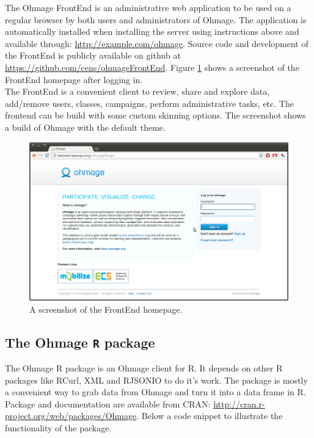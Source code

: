 \documentclass{scrartcl}
\begin{document}
The Ohmage FrontEnd is an administrative web application to be used on a regular
browser by both users and administrators of Ohmage. The application is
automatically installed when installing the server using instructions above and
available through: \url{http://example.com/ohmage}. Source code and
development of the FrontEnd is publicly available on github at
\url{https://github.com/cens/ohmageFrontEnd}. Figure \ref{fig:frontend} shows a
screenshot of the FrontEnd homepage after logging in. \\

\noindent The FrontEnd is a convenient client to review, share and explore data,
add/remove users, classes, campaigns, perform administrative tasks, etc. The
frontend can be build with some custom skinning options. The screenshot shows a build of
Ohmage with the default theme.

\begin{figure}[h!]
\begin{center}
\includegraphics[width=15cm]{frontend.png}
\caption{A screenshot of the FrontEnd homepage.}
\label{fig:frontend}
\end{center}
\end{figure}

\subsection{The Ohmage \texttt{R} package}

The Ohmage R package is an Ohmage client for R. It depends on other R packages
like RCurl, XML and RJSONIO to do it's work. The package is mostly a convenient
way to grab data from Ohmage and turn it into a data frame in R. Package and
documentation are available from CRAN:
\url{http://cran.r-project.org/web/packages/Ohmage}. Below a code snippet to
illustrate the functionality of the package.
\end{document}
